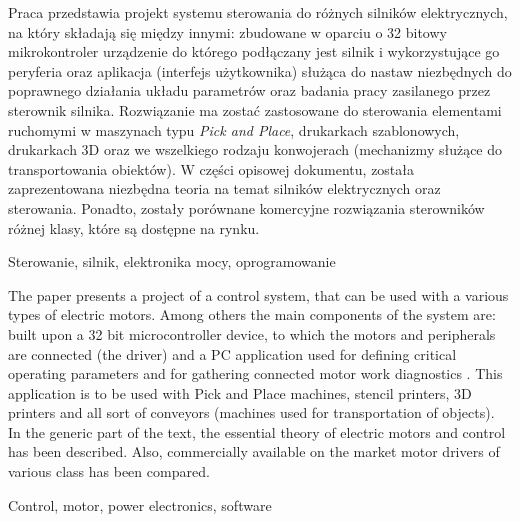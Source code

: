 \thispagestyle{empty}

Praca przedstawia projekt systemu sterowania do różnych silników elektrycznych, na który składają się między innymi: zbudowane w oparciu o 32 bitowy mikrokontroler urządzenie do którego podłączany jest silnik i wykorzystujące go peryferia oraz aplikacja (interfejs użytkownika) służąca do nastaw niezbędnych do poprawnego działania układu parametrów   oraz badania pracy zasilanego przez sterownik silnika. Rozwiązanie ma zostać zastosowane do sterowania elementami ruchomymi w maszynach typu {\it Pick and Place}, drukarkach szablonowych, drukarkach 3D oraz we wszelkiego rodzaju konwojerach (mechanizmy służące do transportowania obiektów). W części opisowej dokumentu, została zaprezentowana niezbędna teoria na temat silników elektrycznych oraz sterowania. Ponadto, zostały porównane komercyjne rozwiązania sterowników różnej klasy, które są dostępne na rynku.

Sterowanie, silnik, elektronika mocy, oprogramowanie

The paper presents a project of a control system, that can be used with a various types of electric motors. Among others the main components of the system are: built upon a 32 bit microcontroller device, to which the motors and peripherals are connected (the driver) and a PC application used for defining critical operating parameters and for gathering connected motor work diagnostics . This application is to be used with Pick and Place machines, stencil printers, 3D printers and all sort of conveyors (machines used for transportation of objects). In the generic part of the text, the essential theory of electric motors and control has been described. Also, commercially available on the market  motor drivers of various class has been compared.

Control, motor, power electronics, software


\clearpage
